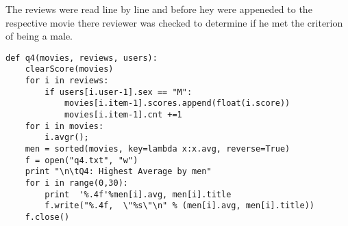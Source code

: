 \begin{flushleft}

The reviews were read line by line and before hey were appeneded to the respective movie there reviewer was checked to determine if he met the criterion of being a male. 


\begin{lstlisting}[caption={Python code for question 4}]
def q4(movies, reviews, users):
	clearScore(movies)
	for i in reviews:
		if users[i.user-1].sex == "M":
			movies[i.item-1].scores.append(float(i.score))
			movies[i.item-1].cnt +=1
	for i in movies:
		i.avgr(); 
	men = sorted(movies, key=lambda x:x.avg, reverse=True)
	f = open("q4.txt", "w")
	print "\n\tQ4: Highest Average by men"
	for i in range(0,30):
		print  '%.4f'%men[i].avg, men[i].title
		f.write("%.4f,  \"%s\"\n" % (men[i].avg, men[i].title))
	f.close()
\end{lstlisting}



\end{flushleft}

